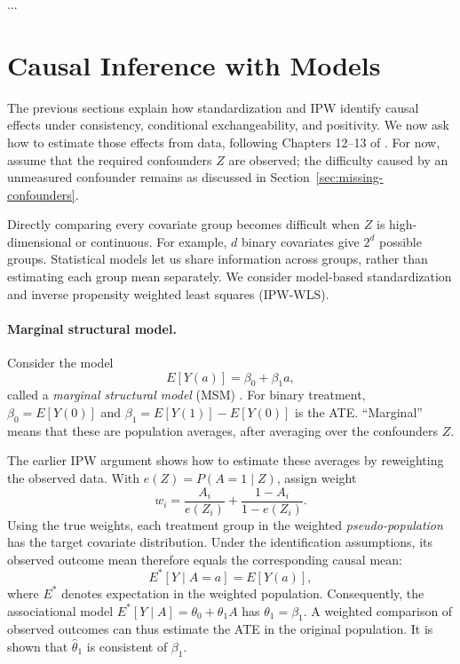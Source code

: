 \documentclass[11pt,twoside]{article}
\begin{document}
\begin{remark} 
    ...
\end{remark}

\section{Causal Inference with Models}
\label{sec:causal-models}

The previous sections explain how standardization and IPW identify causal effects under consistency, conditional exchangeability, and positivity. We now ask how to estimate those effects from data, following Chapters 12--13 of \cite{hernanrobins2020whatif}. For now, assume that the required confounders $Z$ are observed; the difficulty caused by an unmeasured confounder remains as discussed in Section~\ref{sec:missing-confounders}.

Directly comparing every covariate group becomes difficult when $Z$ is high-dimensional or continuous. For example, $d$ binary covariates give $2^d$ possible groups. Statistical models let us share information across groups, rather than estimating each group mean separately. We consider model-based standardization and inverse propensity weighted least squares (IPW-WLS).

\paragraph{Marginal structural model.}
Consider the model
\[
 E[Y(a)]=\beta_0+\beta_1a,
\]
called a \emph{marginal structural model} (MSM) \cite{robins2000marginal}. For binary treatment, $\beta_0=E[Y(0)]$ and $\beta_1=E[Y(1)]-E[Y(0)]$ is the ATE. ``Marginal'' means that these are population averages, after averaging over the confounders $Z$.

The earlier IPW argument shows how to estimate these averages by reweighting the observed data. With $e(Z)=P(A=1\mid Z)$, assign weight
\[
 w_i=\frac{A_i}{e(Z_i)}+\frac{1-A_i}{1-e(Z_i)}.
\]
Using the true weights, each treatment group in the weighted \emph{pseudo-population} has the target covariate distribution. Under the identification assumptions, its observed outcome mean therefore equals the corresponding causal mean:
\[
 E^*[Y\mid A=a]=E[Y(a)],
\]
where $E^*$ denotes expectation in the weighted population. Consequently, the associational model $E^*[Y\mid A]=\theta_0+\theta_1 A$ has $\theta_1=\beta_1$. A weighted comparison of observed outcomes can thus estimate the ATE in the original population. It is shown that $\hat{\theta}_1$ is consistent of $\beta_1$.
\end{document}

